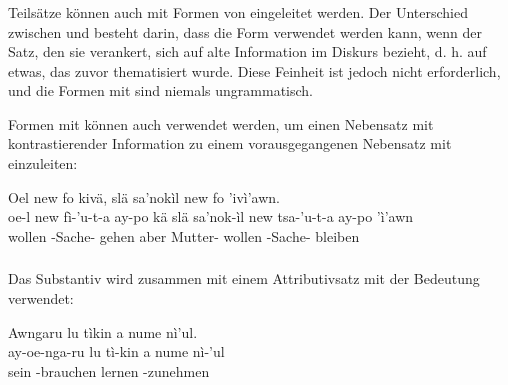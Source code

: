 \subsubsection{} Teilsätze können auch mit Formen von  eingeleitet werden. Der Unterschied zwischen  und  besteht darin, dass die Form  verwendet werden kann, wenn der Satz, den sie verankert, sich auf alte Information im Diskurs bezieht, d. h. auf etwas, das zuvor thematisiert wurde. Diese Feinheit ist jedoch nicht erforderlich, und die Formen mit  sind niemals ungrammatisch. 

Formen mit  können auch verwendet werden, um einen Nebensatz mit kontrastierender Information zu einem vorausgegangenen Nebensatz mit  einzuleiten:

\begin{interlin}
	\glll Oel new  fo kivä, slä sa'nokìl new  fo 'ivì'awn. \\
	oe-l new fì-'u-t-a ay-po kä slä sa'nok-ìl new tsa-'u-t-a ay-po 'ì'awn\\
	 wollen -Sache-  gehen aber Mutter- wollen -Sache-  bleiben \\
\end{interlin}

\subsubsection{} Das Substantiv   wird zusammen mit einem Attributivsatz mit der Bedeutung  verwendet:

\begin{interlin}
	\glll \Npawl{}Awngaru lu tìkin a nume nì'ul. \\
	ay-oe-nga-ru lu tì-kin a nume nì-'ul \\
	 sein -brauchen  lernen -zunehmen \\
\end{interlin}

